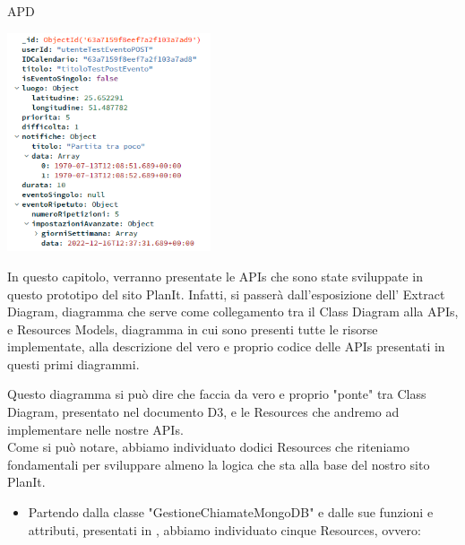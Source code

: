 \begin{listaPersonale} {APD}
\begin{center}
    \end{center}
    \begin{center}
        \includegraphics[width=0.45\textwidth, height=0.4\textheight]{img/png/DB/evento_ripetuto_intero.png}
    \end{center}
    \newpage
    In questo capitolo, verranno presentate le APIs che sono state sviluppate in questo prototipo del sito PlanIt. Infatti, si passerà dall'esposizione dell' Extract Diagram, diagramma che serve come collegamento tra il Class Diagram alla APIs, e Resources Models, diagramma in cui sono presenti tutte le risorse implementate, alla descrizione del vero e proprio codice delle APIs presentati in questi primi diagrammi.
    \begin{listaPersonale2}[APD]{}
        Questo diagramma si può dire che faccia da vero e proprio "ponte" tra Class Diagram, presentato nel documento D3, e le Resources che andremo ad implementare nelle nostre APIs. \\
        Come si può notare, abbiamo individuato dodici Resources che riteniamo fondamentali per sviluppare almeno la logica che sta alla base del nostro sito PlanIt. \\
        \begin{itemize}
            \item Partendo dalla classe "GestioneChiamateMongoDB" e dalle sue funzioni e attributi, presentati in , abbiamo individuato cinque Resources, ovvero:

\end{itemize}
\end{listaPersonale2}
\end{listaPersonale}
